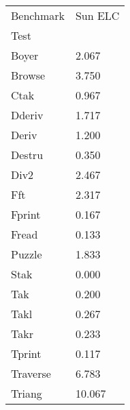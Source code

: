 \begin{tabular}{|l|l|} \hline
Benchmark &   Sun ELC \\
  Test    &           \\ \hline
  Boyer  &        2.067 \\
  Browse  &       3.750 \\
  Ctak  &         0.967 \\
  Dderiv  &       1.717 \\
  Deriv  &        1.200 \\
  Destru  &       0.350 \\
  Div2  &         2.467 \\
  Fft  &          2.317 \\
  Fprint  &       0.167 \\
  Fread  &        0.133 \\
  Puzzle  &       1.833 \\
  Stak  &         0.000 \\
  Tak  &          0.200 \\
  Takl  &         0.267 \\
  Takr  &         0.233 \\
  Tprint  &       0.117 \\
  Traverse  &     6.783 \\
  Triang  &       10.067 \\ \hline
\end{tabular}

